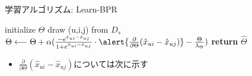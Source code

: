 \documentclass[aspectratio=43, dvipdfmx, 11pt]{beamer} %
\begin{document}
\begin{frame}{学習アルゴリズム: Learn-BPR}
    \Large \begin{algorithmic}[1]
        \State initialize $\Theta$
        \Repeat
            \State draw (u,i,j) from $D_s$
            \State $\Theta \longleftarrow \Theta+\alpha(\frac{-e^{\hat{x}_{ui}-\hat{x}_{uj}}}{1+e^{\hat{x}_{ui}-\hat{x}_{uj}}} \cdot \alert{\frac{\partial}{\partial \Theta}(\hat{x}_{ui}-\hat{x}_{uj})}-\frac{\Theta}{\lambda_{\Theta}})$
        \State \textbf{return} $\hat{\Theta}$
        \EndProcedure
   \end{algorithmic}

   \begin{itemize}
   \item \Large $\frac{\partial}{\partial \Theta}(\hat{x}_{ui}-\hat{x}_{uj})$については次に示す
   \end{itemize}
\end{frame}
\end{document}
